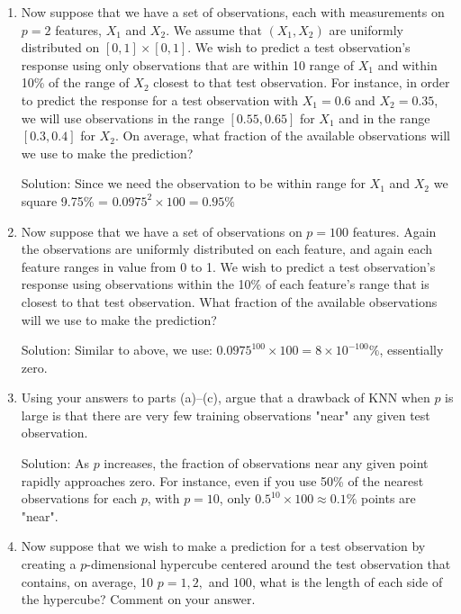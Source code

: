 \documentclass{article}
\begin{document}
\begin{enumerate}
\begin{enumerate}
Solution: For values in $0...0.05$, we use less than 10\% of observations (between 5\% and
10\%, 7.5\% on average), similarly with values in $0.95...1$. For values in
$0.05...0.95$ we use 10\% of available observations. The (weighted) average is
then $7.5 \times 0.1 + 10 \times 0.9 = 9.75\%$.

\item Now suppose that we have a set of observations, each with measurements on
    $p = 2$ features, $X_1$ and $X_2$. We assume that $(X_1, X_2)$ are
    uniformly distributed on $[0, 1] \times [0, 1]$. We wish to predict a test
    observation's response using only observations that are within 10%
    range of $X_1$ and within 10\% of the range of $X_2$ closest to that test
    observation. For instance, in order to predict the response for a test
    observation with $X_1 = 0.6$ and $X_2 = 0.35$, we will use observations in
    the range $[0.55, 0.65]$ for $X_1$ and in the range $[0.3, 0.4]$ for $X_2$.
    On average, what fraction of the available observations will we use to
    make the prediction?

Solution: Since we need the observation to be within range for $X_1$ and $X_2$ we square
9.75\% = $0.0975^2 \times 100 = 0.95\%$

\item Now suppose that we have a set of observations on $p = 100$ features. Again
    the observations are uniformly distributed on each feature, and again each
    feature ranges in value from 0 to 1. We wish to predict a test
    observation's response using observations within the 10\% of each feature's
    range that is closest to that test observation. What fraction of the
    available observations will we use to make the prediction?

Solution: Similar to above, we use: $0.0975^{100} \times 100 = 8 \times 10^{-100}\%$,
essentially zero.

\item Using your answers to parts (a)--(c), argue that a drawback of KNN when
    $p$ is large is that there are very few training observations "near" any
    given test observation.

Solution: As $p$ increases, the fraction of observations near any given point rapidly
approaches zero. For instance, even if you use 50\% of the nearest observations
for each $p$, with $p = 10$, only $0.5^{10} \times 100 \approx 0.1\%$ points are
"near".

\item Now suppose that we wish to make a prediction for a test observation by
    creating a $p$-dimensional hypercube centered around the test observation
    that contains, on average, 10%
    $p = 1,2,$ and $100$, what is the length of each side of the hypercube?
    Comment on your answer.


\end{enumerate}
\end{enumerate}
\end{document}

